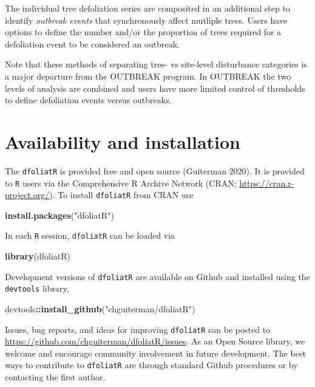 \documentclass[review]{elsarticle} %
\newenvironment{Shaded}{\begin{snugshade}}{\end{snugshade}}
\newcommand{\KeywordTok}[1]{\textcolor[rgb]{0.13,0.29,0.53}{\textbf{#1}}}
\newcommand{\NormalTok}[1]{#1}
\newcommand{\OperatorTok}[1]{\textcolor[rgb]{0.81,0.36,0.00}{\textbf{#1}}}
\newcommand{\StringTok}[1]{\textcolor[rgb]{0.31,0.60,0.02}{#1}}
\begin{document}
The individual tree defoliation series are composited in an additional
step to identify \emph{outbreak events} that synchronously affect
mutliple trees. Users have options to define the number and/or the
proportion of trees required for a defoliation event to be considered an
outbreak.

Note that these methods of separating tree- vs site-level disturbance
categories is a major departure from the OUTBREAK program. In OUTBREAK
the two levels of analysis are combined and users have more limited
control of thresholds to define defoliation events versus outbreaks.

\hypertarget{availability-and-installation}{%
\section{Availability and
installation}\label{availability-and-installation}}

The \texttt{dfoliatR} is provided free and open source (Guiterman 2020).
It is provided to \texttt{R} users via the Comprehensive R Archive
Network (CRAN; \url{https://cran.r-project.org/}). To install
\texttt{dfoliatR} from CRAN use

\begin{Shaded}
\begin{Highlighting}[]
\KeywordTok{install.packages}\NormalTok{(}\StringTok{"dfoliatR"}\NormalTok{)}
\end{Highlighting}
\end{Shaded}

In each \texttt{R} session, \texttt{dfoliatR} can be loaded via

\begin{Shaded}
\begin{Highlighting}[]
\KeywordTok{library}\NormalTok{(dfoliatR)}
\end{Highlighting}
\end{Shaded}

Development versions of \texttt{dfoliatR} are available on Github and
installed using the \texttt{devtools} library,

\begin{Shaded}
\begin{Highlighting}[]
\NormalTok{devtools}\OperatorTok{::}\KeywordTok{install_github}\NormalTok{(}\StringTok{"chguiterman/dfoliatR"}\NormalTok{)}
\end{Highlighting}
\end{Shaded}

Issues, bug reports, and ideas for improving \texttt{dfoliatR} can be
posted to \url{https://github.com/chguiterman/dfoliatR/issues}. As an
Open Source library, we welcome and encourage community involvement in
future development. The best ways to contribute to \texttt{dfoliatR} are
through standard Github procedures or by contacting the first author.
\end{document}
